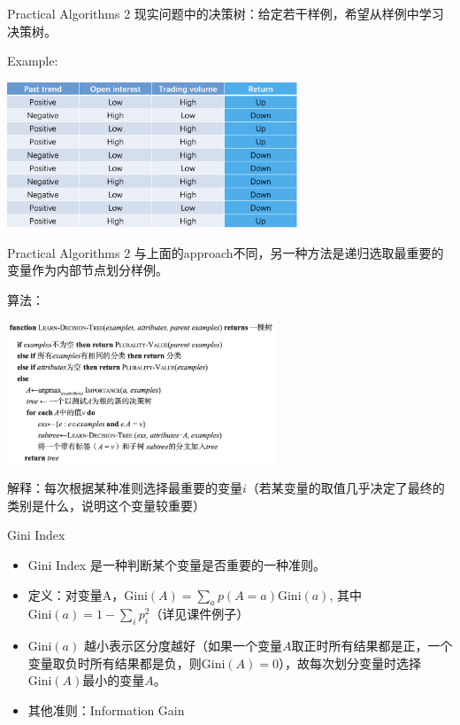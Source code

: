 \begin{frame}{Practical Algorithms 2}
    现实问题中的决策树：给定若干样例，希望从样例中学习决策树。

    Example:
    \begin{center}
        \includegraphics[width=0.65\textwidth]{assets/learndte.png}
    \end{center}

\end{frame}

\begin{frame}{Practical Algorithms 2}
    与上面的approach不同，另一种方法是递归选取最重要的变量作为内部节点划分样例。

    算法：
    \begin{center}
        \includegraphics[width=0.6\textwidth]{assets/learndta.png}
    \end{center}
    解释：每次根据某种准则选择最重要的变量$i$（若某变量的取值几乎决定了最终的类别是什么，说明这个变量较重要）

\end{frame}

\begin{frame}{Gini Index}
    \begin{itemize}
        \item Gini Index 是一种判断某个变量是否重要的一种准则。
        \item 定义：对变量A，$\text{Gini}(A)= \sum_{a} p(A=a) \text{Gini}(a)$, 其中$\text{Gini}(a) = 1- \sum_{i}p_i^{2}$（详见课件例子）
        \item $\text{Gini}(a)$ 越小表示区分度越好（如果一个变量$A$取正时所有结果都是正，一个变量取负时所有结果都是负，则$\text{Gini}(A) = 0$），故每次划分变量时选择$\text{Gini}(A)$最小的变量$A$。
        \item 其他准则：Information Gain
    \end{itemize}
\end{frame}
